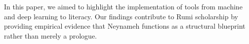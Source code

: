 \documentclass[twoside]{article}
\begin{document}
In this paper, we aimed  to highlight the implementation of tools from machine and deep  learning to literacy. 
Our findings contribute to Rumi scholarship by providing empirical evidence that Neynameh functions 
as a structural blueprint rather than merely a prologue. 

\end{document}
